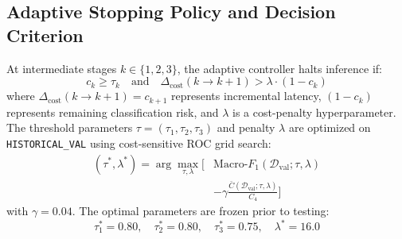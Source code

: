 \documentclass[journal]{IEEEtran}
\begin{document}
\subsection{Adaptive Stopping Policy and Decision Criterion}
At intermediate stages $k \in \{1, 2, 3\}$, the adaptive controller halts inference if:
\begin{equation}
c_k \ge \tau_k \quad \text{and} \quad \Delta_{\mathrm{cost}}(k \to k+1) > \lambda \cdot (1 - c_k)
\end{equation}
where $\Delta_{\mathrm{cost}}(k \to k+1) = c_{k+1}$ represents incremental latency, $(1 - c_k)$ represents remaining classification risk, and $\lambda$ is a cost-penalty hyperparameter. The threshold parameters $\tau = (\tau_1, \tau_2, \tau_3)$ and penalty $\lambda$ are optimized on \texttt{HISTORICAL\_VAL} using cost-sensitive ROC grid search:
\begin{equation}
\begin{aligned}
(\tau^*, \lambda^*) = \arg\max_{\tau, \lambda} \Big[ & \mathrm{Macro}\text{-}F_1(\mathcal{D}_{\mathrm{val}}; \tau, \lambda) \\
& - \gamma \frac{\bar{C}(\mathcal{D}_{\mathrm{val}}; \tau, \lambda)}{C_4} \Big]
\end{aligned}
\end{equation}
with $\gamma = 0.04$. The optimal parameters are frozen prior to testing:
\begin{equation}
\tau_1^* = 0.80, \quad \tau_2^* = 0.80, \quad \tau_3^* = 0.75, \quad \lambda^* = 16.0
\end{equation}
\end{document}
